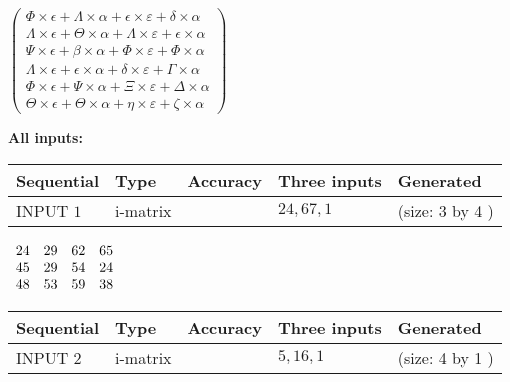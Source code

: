 \documentclass[12pt]{article}
\begin{document}
   
 $   \left( \begin{array}
 {
 c
 }
 \Phi \times  \epsilon   +  \Lambda \times  \alpha   +  \epsilon \times  \varepsilon   +  \delta \times  \alpha \\ 
 \Lambda \times  \epsilon   +  \Theta \times  \alpha   +  \Lambda \times  \varepsilon   +  \epsilon \times  \alpha \\ 
 \Psi \times  \epsilon   +  \beta \times  \alpha   +  \Phi \times  \varepsilon   +  \Phi \times  \alpha \\ 
 \Lambda \times  \epsilon   +  \epsilon \times  \alpha   +  \delta \times  \varepsilon   +  \Gamma \times  \alpha \\ 
 \Phi \times  \epsilon   +  \Psi \times  \alpha   +                     \Xi \times  \varepsilon   +  \Delta \times  \alpha \\ 
 \Theta \times  \epsilon   +  \Theta \times  \alpha   +  \eta \times  \varepsilon   +                     \zeta \times  \alpha
 \end{array} \right) $ 
   
   
\noindent\vspace{0.1in}\hspace{-0.08in} {\textbf{\Large{All inputs: }}}
   
   
  
  
\noindent\begin{tabular}{|l|l|l|l|l|}
\hline
 Sequential & Type & Accuracy & Three inputs & Generated \\ 
\hline
 
 
  INPUT $  1 $ & i-matrix &  & $
 24
 , 
 67
 , 
 1
 $ & (size:  3  by  4 )
 \\  \hline  
 \end{tabular}
   
   
 $\begin{array}{
 c
 c
 c
 c
 }
 24  & 
 29  & 
 62  & 
 65  \\ 
 45  & 
 29  & 
 54  & 
 24  \\ 
 48  & 
 53  & 
 59  & 
 38
\end{array}  $ 
  
  
\noindent\begin{tabular}{|l|l|l|l|l|}
\hline
 Sequential & Type & Accuracy & Three inputs & Generated \\ 
\hline
 
 
  INPUT $  2 $ & i-matrix &  & $
 5
 , 
 16
 , 
 1
 $ & (size:  4  by  1 )
 \\  \hline  
 \end{tabular}
   
\end{document}
